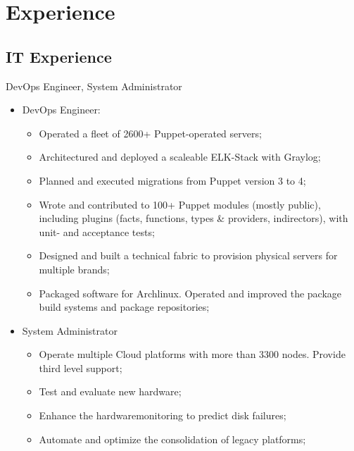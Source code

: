 \documentclass[11pt,a4paper,nolmodern]{moderncv}
\begin{document}
\newpage
\section{Experience}
\subsection{IT Experience}


%
  {DevOps Engineer, System Administrator
\begin{itemize}
  \item DevOps Engineer:
    \begin{itemize}
      \item Operated a fleet of 2600+ Puppet-operated servers;
      \item Architectured and deployed a scaleable ELK-Stack with Graylog;
      \item Planned and executed migrations from Puppet version 3 to 4;
      \item Wrote and contributed to 100+ Puppet modules (mostly public), including plugins (facts, functions, types \& providers, indirectors), with unit- and acceptance tests;
      \item Designed and built a technical fabric to provision physical servers for multiple brands;
      \item Packaged software for Archlinux. Operated and improved the package build systems and package repositories;
    \end{itemize}
  \item System Administrator
    \begin{itemize}
      \item Operate multiple Cloud platforms with more than 3300 nodes. Provide third level support;
      \item Test and evaluate new hardware;
      \item Enhance the hardwaremonitoring to predict disk failures;
      \item Automate and optimize the consolidation of legacy platforms;
    \end{itemize}
\end{itemize}}
\end{document}
